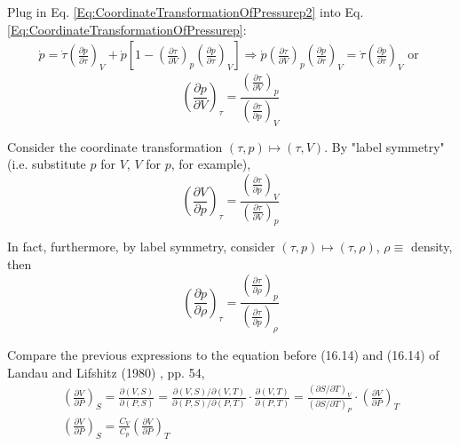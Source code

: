 \documentclass[twoside,landscape,10pt]{amsart}
\theoremstyle{plain}
\theoremstyle{definition}
\theoremstyle{remark}
\theoremstyle{remark}
\begin{document}
\begin{multicols*}{2}
Plug in Eq. \ref{Eq:CoordinateTransformationOfPressurep2} into Eq. \ref{Eq:CoordinateTransformationOfPressurep}:
\[
\begin{gathered}
\dot{p} = \dot{\tau} \left( \frac{ \partial p}{ \partial \tau} \right)_V + \dot{p} \left[ 1 - \left( \frac{ \partial \tau}{ \partial V} \right)_p \left( \frac{\partial p}{ \partial \tau} \right)_V \right] \Longrightarrow \dot{p} \left( \frac{ \partial \tau }{ \partial V } \right)_p \left( \frac{ \partial p }{ \partial \tau } \right)_V = \dot{\tau} \left( \frac{ \partial p }{ \partial \tau } \right)_V \text{ or }
\end{gathered}
\]
\begin{equation}
\boxed{ \left( \frac{ \partial p }{ \partial V} \right)_{\tau} = \frac{\left( \frac{ \partial \tau }{ \partial V } \right)_p }{ \left( \frac{ \partial \tau }{ \partial p } \right)_V} }
\end{equation}

Consider the coordinate transformation $(\tau, p) \mapsto (\tau, V)$. By "label symmetry" (i.e. substitute $p$ for $V$, $V$ for $p$, for example),
\begin{equation}
\boxed{ \left( \frac{\partial V}{ \partial p } \right)_{\tau} = \frac{ \left( \frac{ \partial \tau }{ \partial p } \right)_V}{ \left( \frac{ \partial \tau }{ \partial V } \right)_p } }
\end{equation}

In fact, furthermore, by label symmetry, consider $(\tau, p) \mapsto (\tau, \rho)$, $\rho \equiv $ density, then
\begin{equation}
\boxed{ \left( \frac{\partial p}{ \partial \rho } \right)_{\tau} = \frac{ \left( \frac{ \partial \tau }{ \partial \rho } \right)_p}{ \left( \frac{ \partial \tau }{ \partial p } \right)_{\rho} } }
\end{equation}

Compare the previous expressions to the equation before (16.14) and (16.14) of Landau and Lifshitz (1980) \cite{LLandauELifshitz1980}, pp. 54,
\[
\begin{gathered}
\left( \frac{\partial V}{ \partial  P } \right)_S = \frac{\partial (V, S) }{ \partial (P, S)} = \frac{\partial( V,S) / \partial (V, T) }{ \partial (P, S)/ \partial (P, T)} \cdot \frac{ \partial (V, T) }{ \partial (P ,T)} = \frac{(\partial S/ \partial T)_V }{ (\partial S / \partial T)_P} \cdot \left( \frac{ \partial V}{ \partial P} \right)_T \\
\left( \frac{\partial V}{ \partial  P } \right)_S = \frac{ C_V}{ C_p} \left( \frac{\partial V}{ \partial  P } \right)_T
\end{gathered}
\]


\end{multicols*}
\end{document}
